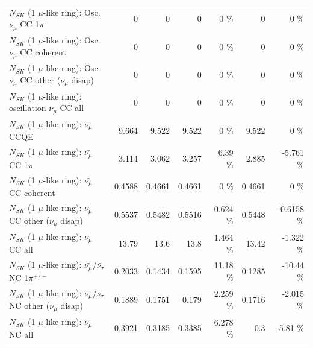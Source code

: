 \begin{table}
\begin{tabular}{| l | r | r | r  r | r  r |}
                          $N_{SK}$ (1 $\mu$-like ring): Osc. $\nu_\mu$ CC 1$\pi$ &               0 &               0 &               0 &        0 \%  &               0 &        0 \%  \\ 
                        $N_{SK}$ (1 $\mu$-like ring): Osc. $\nu_\mu$ CC coherent &               0 &               0 &               0 &        0 \%  &               0 &        0 \%  \\ 
         $N_{SK}$ (1 $\mu$-like ring): Osc. $\nu_\mu$ CC other ($\nu_\mu$ disap) &               0 &               0 &               0 &        0 \%  &               0 &        0 \%  \\ 
                      $N_{SK}$ (1 $\mu$-like ring): oscillation $\nu_\mu$ CC all &               0 &               0 &               0 &        0 \%  &               0 &        0 \%  \\ 
\hline
\hline
                              $N_{SK}$ (1 $\mu$-like ring): $\bar{\nu_\mu}$ CCQE &           9.664 &           9.522 &           9.522 &        0 \%  &           9.522 &        0 \%  \\ 
                         $N_{SK}$ (1 $\mu$-like ring): $\bar{\nu_\mu}$ CC 1$\pi$ &           3.114 &           3.062 &           3.257 &     6.39 \%  &           2.885 &   -5.761 \%  \\ 
                       $N_{SK}$ (1 $\mu$-like ring): $\bar{\nu_\mu}$ CC coherent &          0.4588 &          0.4661 &          0.4661 &        0 \%  &          0.4661 &        0 \%  \\ 
        $N_{SK}$ (1 $\mu$-like ring): $\bar{\nu_\mu}$ CC other ($\nu_\mu$ disap) &          0.5537 &          0.5482 &          0.5516 &    0.624 \%  &          0.5448 &  -0.6158 \%  \\ 
                          $N_{SK}$ (1 $\mu$-like ring): $\bar{\nu_{\mu}}$ CC all &           13.79 &            13.6 &            13.8 &    1.464 \%  &           13.42 &   -1.322 \%  \\ 
\hline
  $N_{SK}$ (1 $\mu$-like ring): $\bar{\nu_\mu}$/$\bar{\nu_\tau}$ NC 1$\pi^{+/-}$ &          0.2033 &          0.1434 &          0.1595 &    11.18 \%  &          0.1285 &   -10.44 \%  \\ 
$N_{SK}$ (1 $\mu$-like ring): $\bar{\nu_\mu}$/$\bar{\nu_\tau}$ NC other ($\nu_\mu$ disap) &          0.1889 &          0.1751 &           0.179 &    2.259 \%  &          0.1716 &   -2.015 \%  \\ 
                          $N_{SK}$ (1 $\mu$-like ring): $\bar{\nu_{\mu}}$ NC all &          0.3921 &          0.3185 &          0.3385 &    6.278 \%  &             0.3 &    -5.81 \%  \\ 

\end{tabular}
\end{table}

